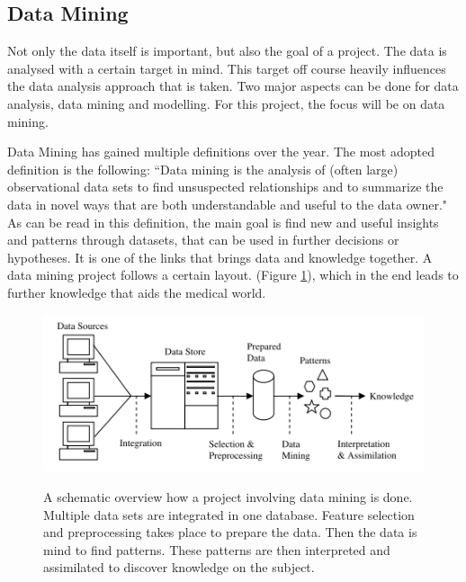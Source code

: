 \documentclass[10pt,a4paper]{article}
\begin{document}
	\subsection{Data Mining}
	\label{subsec:DataMining}
	
	Not only the data itself is important, but also the goal of a project. The data is analysed with a certain target in mind. This target off course heavily influences the data analysis approach that is taken. Two major aspects can be done for data analysis, data mining and modelling. For this project, the focus will be on data mining.
	
	Data Mining has gained multiple definitions over the year. The most adopted definition is the following: “Data mining is the analysis of (often large) observational data sets to find unsuspected relationships and to summarize the data in novel ways that are both understandable and useful to the data owner." \cite{hand2001principles} As can be read in this definition, the main goal is find new and useful insights and patterns through datasets, that can be used in further decisions or hypotheses.\cite{chen2006medical, 7024124} It is one of the links that brings data and knowledge together.\cite{Yoo2012} A data mining project follows a certain layout. (Figure \ref{fig:ResearchSteps}), which in the end leads to further knowledge that aids the medical world.\cite{bramer2007principles} 
	
	\begin{figure}
		\includegraphics[scale=1.0]{ResearchSteps.png}
		\label{fig:ResearchSteps}
		\caption{A schematic overview how a project involving data mining is done. Multiple data sets are integrated in one database. Feature selection and preprocessing takes place to prepare the data. Then the data is mind to find patterns. These patterns are then interpreted and assimilated to discover knowledge on the subject.\cite{bramer2007principles}}
	\end{figure}
	
\end{document}
